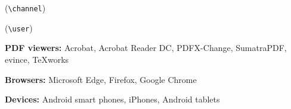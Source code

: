 \documentclass{article}
\begin{document}
 (\verb~\channel~)

 (\verb~\user~)


\textbf{PDF viewers:} \textsf{Acrobat}, \textsf{Acrobat Reader DC}, \textsf{PDFX-Change}, \textsf{SumatraPDF}, \textsf{evince}, \textsf{TeXworks}

\textbf{Browsers:} \textsf{Microsoft Edge}, \textsf{Firefox}, \textsf{Google Chrome}

\textbf{Devices:} \textsf{Android} smart phones, \textsf{iPhones}, \textsf{Android} tablets
\end{document}
